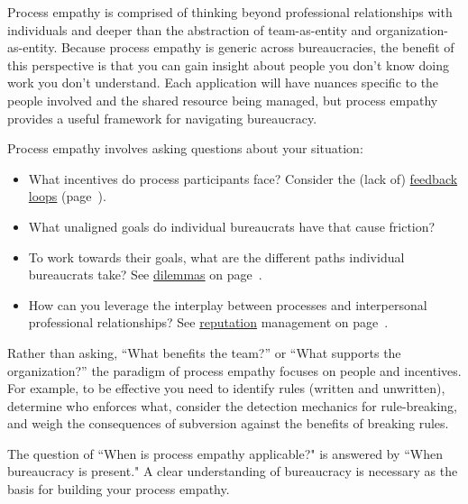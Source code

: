 Process empathy is comprised of thinking beyond professional relationships with individuals and deeper than the abstraction of team-as-entity and organization-as-entity. 
Because process empathy is generic across bureaucracies, the benefit of this perspective is that you can gain insight about people you don't know doing work you don't understand.
Each application will have nuances specific to the people involved and the shared resource being managed, but process empathy provides a useful framework for navigating bureaucracy.


Process empathy involves asking questions about your situation:
\begin{itemize}
    \item What incentives do process participants face?
Consider the (lack of) \hyperref[sec:feedback-loop-and-ripples]{feedback loops} (page~\pageref{sec:feedback-loop-and-ripples}).
    \item What unaligned goals do individual bureaucrats have that cause friction?
    \item To work towards their goals, what are the different paths individual bureaucrats take?
See \hyperref[sec:dilemma-trilemma]{dilemmas} on page~\pageref{sec:dilemma-trilemma}.
    \item How can you leverage the interplay between processes and interpersonal professional relationships?
See \hyperref[sec:reputation]{reputation} management on page~\pageref{sec:reputation}.
\end{itemize}

Rather than asking, ``What benefits the team?'' or ``What supports the organization?'' the paradigm of process empathy focuses on people and incentives. %
For example, to be effective you need to 
identify rules (written and unwritten), determine who enforces what, consider the detection mechanics for rule-breaking, and weigh the consequences of subversion against the benefits of breaking rules.


The question of ``When is process empathy applicable?" is answered by ``When bureaucracy is present." A clear understanding of bureaucracy is necessary as the basis for building your process empathy.
